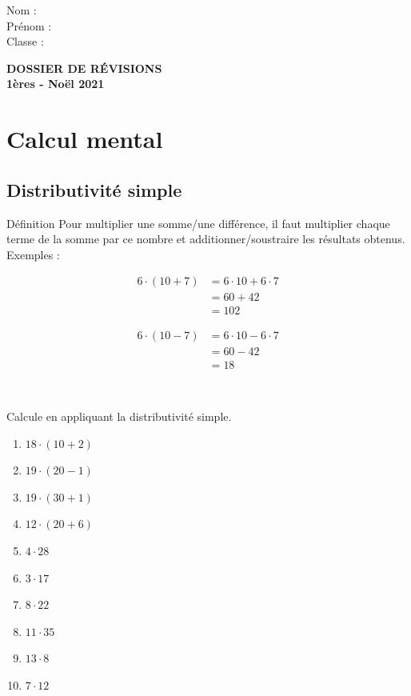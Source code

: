 \documentclass[10pt,a4paper]{article}
\begin{document}
Nom : \\
Prénom : \\ 
Classe : \\

\vspace{2cm}

\begin{center}
	\Huge{\textbf{DOSSIER DE RÉVISIONS}}\\
	\huge{\textbf{1ères - Noël 2021}}
\end{center}
	
\normalsize
	\section{Calcul mental}
		\subsection{Distributivité simple}	
			\begin{bclogo}[arrondi=0.3, logo=\bccle]{Définition}
				Pour multiplier une somme/une différence, il faut multiplier chaque terme de la somme par ce nombre et additionner/soustraire les résultats obtenus.\\
				Exemples : 
				\parbox[t]{0.3\textwidth}{
					\begin{align*}
						6\cdot (10+7) &= 6\cdot 10 + 6\cdot 7\\
						& = 60 + 42\\
						& = 102
					\end{align*}}
				\parbox[t]{0.3\textwidth}{
					\begin{align*}
						6\cdot (10-7) &= 6\cdot 10 - 6\cdot 7\\
						& = 60 - 42\\
						& = 18
					\end{align*}}\\
			\end{bclogo}

\begin{exercise}
Calcule en appliquant la distributivité simple.
	\begin{enumerate}[cols=5]
		\item $18\cdot (10+2)$
		\item $19\cdot (20-1)$
		\item $19\cdot (30+1)$
		\item $12\cdot (20+6)$
		\item $4\cdot 28$
		\item $3\cdot 17$
		\item $8\cdot 22$
		\item $11\cdot 35$
		\item $13\cdot 8$
		\item $7\cdot 12$
	\end{enumerate}
\end{exercise}
\end{document}

